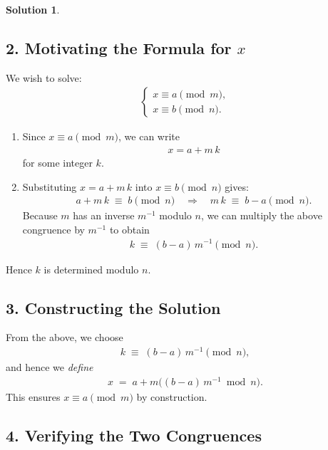 \documentclass[12pt]{article}
\theoremstyle{definition} %
\newtheorem{solution}{Solution}
\theoremstyle{plain} %
\begin{document}
\begin{solution}
\subsection*{2. Motivating the Formula for $x$}

We wish to solve:
\begin{align}
\begin{cases}
x \equiv a \pmod{m}, \\
x \equiv b \pmod{n}.
\end{cases}
\end{align}

\begin{enumerate}
\item Since $x \equiv a \pmod{m}$, we can write
\begin{align}
x = a + m\,k
\end{align}
for some integer $k$.  

\item Substituting $x = a + m\,k$ into $x \equiv b \pmod{n}$ gives:
\begin{align}
a + m\,k \;\equiv\; b \pmod{n} 
\quad \Longrightarrow \quad 
m\,k \;\equiv\; b - a \pmod{n}.
\end{align}
Because $m$ has an inverse $m^{-1}$ modulo $n$, we can multiply the above congruence by $m^{-1}$ to obtain
\begin{align}
k \;\equiv\; (b - a)\, m^{-1} \pmod{n}.
\end{align}
\end{enumerate}

Hence $k$ is determined modulo $n$.

\subsection*{3. Constructing the Solution}

From the above, we choose
\begin{align}
k \;\equiv\; (b - a)\, m^{-1} \pmod{n},
\end{align}
and hence we \emph{define}
\begin{align}
x \;=\; a + m \bigl((b-a)\,m^{-1} \bmod n\bigr).
\end{align}
This ensures $x\equiv a \pmod{m}$ by construction.

\subsection*{4. Verifying the Two Congruences}


\end{solution}
\end{document}
